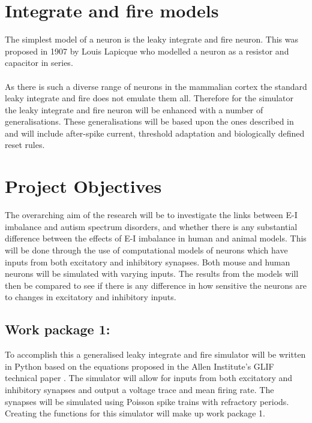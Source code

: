 \documentclass{epsrc}
\begin{document}
\section{Integrate and fire models}
\noindent
The simplest model of a neuron is the leaky integrate and fire neuron. This was proposed in 1907 by Louis Lapicque who modelled a neuron as a resistor and capacitor in series.
\\\\
As there is such a diverse range of neurons in the mammalian cortex the standard leaky integrate and fire does not emulate them all. Therefore for the simulator the leaky integrate and fire neuron will be enhanced with a number of generalisations. These generalisations will be based upon the ones described in \citeauthor{teeter2018generalized}\cite{teeter2018generalized} and will include after-spike current, threshold adaptation and biologically defined reset rules.
\\
\section{Project Objectives}
\noindent
The overarching aim of the research will be to investigate the links between E-I imbalance and autism spectrum disorders, and whether there is any substantial difference between the effects of E-I imbalance in human and animal models. This will be done through the use of computational models of neurons which have inputs from both excitatory and inhibitory synapses. Both mouse and human neurons will be simulated with varying inputs. The results from the models will then be compared to see if there is any difference in how sensitive the neurons are to changes in excitatory and inhibitory inputs.
\\
\subsection{Work package 1:}
\noindent
To accomplish this a generalised leaky integrate and fire simulator will be written in Python based on the equations proposed in the Allen Institute's GLIF technical paper \cite{allen2017GLIF}. The simulator will allow for inputs from both excitatory and inhibitory synapses and output a voltage trace and mean firing rate. The synapses will be simulated using Poisson spike trains with refractory periods. Creating the functions for this simulator will make up work package 1.
\\
\end{document}
